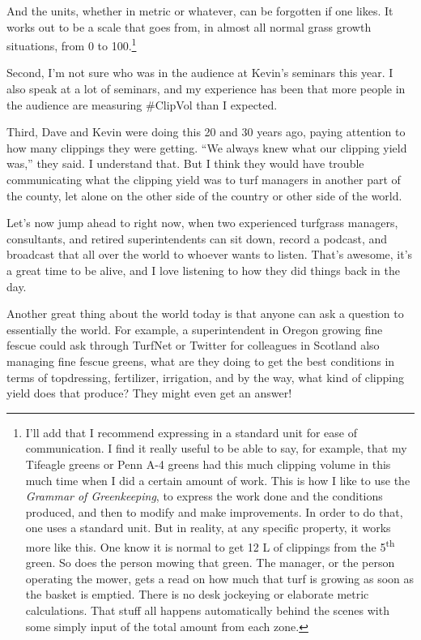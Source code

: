 \documentclass[12pt,b5,]{tufte-book}
\begin{document}
And the units, whether in metric or whatever, can be forgotten if one likes. It works out to be a scale that goes from, in almost all normal grass growth situations, from 0 to 100.\footnote{I'll add that I recommend expressing in a standard unit for ease of communication. I find it really useful to be able to say, for example, that my Tifeagle greens or Penn A-4 greens had this much clipping volume in this much time when I did a certain amount of work. This is how I like to use the \emph{Grammar of Greenkeeping}, to express the work done and the conditions produced, and then to modify and make improvements. In order to do that, one uses a standard unit. But in reality, at any specific property, it works more like this. One know it is normal to get 12 L of clippings from the 5\textsuperscript{th} green. So does the person mowing that green. The manager, or the person operating the mower, gets a read on how much that turf is growing as soon as the basket is emptied. There is no desk jockeying or elaborate metric calculations. That stuff all happens automatically behind the scenes with some simply input of the total amount from each zone.}

Second, I'm not sure who was in the audience at Kevin's seminars this year. I also speak at a lot of seminars, and my experience has been that more people in the audience are measuring \#ClipVol than I expected.

Third, Dave and Kevin were doing this 20 and 30 years ago, paying attention to how many clippings they were getting. ``We always knew what our clipping yield was,'' they said. I understand that. But I think they would have trouble communicating what the clipping yield was to turf managers in another part of the county, let alone on the other side of the country or other side of the world.

Let's now jump ahead to right now, when two experienced turfgrass managers, consultants, and retired superintendents can sit down, record a podcast, and broadcast that all over the world to whoever wants to listen. That's awesome, it's a great time to be alive, and I love listening to how they did things back in the day.

Another great thing about the world today is that anyone can ask a question to essentially the world. For example, a superintendent in Oregon growing fine fescue could ask through TurfNet or Twitter for colleagues in Scotland also managing fine fescue greens, what are they doing to get the best conditions in terms of topdressing, fertilizer, irrigation, and by the way, what kind of clipping yield does that produce? They might even get an answer!
\end{document}
